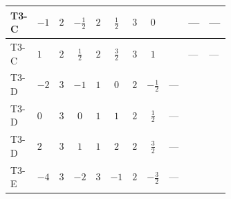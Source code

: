 \documentclass[8pt]{article}
\begin{document}
\begin{landscape}
\begin{longtable}{@{}llcccccc >{\raggedright\arraybackslash}p{0.21\linewidth} >{\raggedright\arraybackslash}p{0.21\linewidth} >{\raggedright\arraybackslash}p{0.21\linewidth}@{}}
\midrule
T3-C & $-1$ & $2$ & $-\frac{1}{2}$ & $2$ & $\frac{1}{2}$ & $3$ & $0$ & \scriptsize\adjustbox{max width=\linewidth}{$\begin{gathered} {m_1^2} (3 T_{\nu}^{(1)}+6 {\lambda_{S_1}^{(1)}})\end{gathered}$} & --- & --- \\
\midrule
T3-C & $1$ & $2$ & $\frac{1}{2}$ & $2$ & $\frac{3}{2}$ & $3$ & $1$ & \scriptsize\adjustbox{max width=\linewidth}{$\begin{gathered} {m_1^2} (3 T_{\nu}^{(1)}+6 {\lambda_{S_1}^{(1)}})\end{gathered}$} & --- & --- \\
\midrule
T3-D & $-2$ & $3$ & $-1$ & $1$ & $0$ & $2$ & $-\frac{1}{2}$ & --- & \scriptsize\adjustbox{max width=\linewidth}{$\begin{gathered} {m_1^2} (2 T_{\nu}^{(1)}+8 {\lambda_{S_1}^{(1)}}+4 {\lambda_{S_1}^{(A)}})\end{gathered}$} & \scriptsize\adjustbox{max width=\linewidth}{$\begin{gathered} -12 {g_2}^2 {m_1^2}\end{gathered}$} \\
\midrule
T3-D & $0$ & $3$ & $0$ & $1$ & $1$ & $2$ & $\frac{1}{2}$ & --- & \scriptsize\adjustbox{max width=\linewidth}{$\begin{gathered} {m_1^2} (2 T_{\nu}^{(1)}+8 {\lambda_{S_1}^{(1)}}+4 {\lambda_{S_1}^{(A)}})\end{gathered}$} & \scriptsize\adjustbox{max width=\linewidth}{$\begin{gathered} -12 {g_2}^2 {m_1^2}\end{gathered}$} \\
\midrule
T3-D & $2$ & $3$ & $1$ & $1$ & $2$ & $2$ & $\frac{3}{2}$ & --- & \scriptsize\adjustbox{max width=\linewidth}{$\begin{gathered} {m_1^2} (2 T_{\nu}^{(1)}+8 {\lambda_{S_1}^{(1)}}+4 {\lambda_{S_1}^{(A)}})\end{gathered}$} & \scriptsize\adjustbox{max width=\linewidth}{$\begin{gathered} -12 {g_2}^2 {m_1^2}\end{gathered}$} \\
\midrule
T3-E & $-4$ & $3$ & $-2$ & $3$ & $-1$ & $2$ & $-\frac{3}{2}$ & --- & \scriptsize\adjustbox{max width=\linewidth}{$\begin{gathered} {m_1^2} (2 T_{\nu}^{(1)}+8 {\lambda_{S_1}^{(1)}}+4 {\lambda_{S_1}^{(A)}})\end{gathered}$} & \scriptsize\adjustbox{max width=\linewidth}{$\begin{gathered} -12 {g_2}^2 {m_1^2}\end{gathered}$} \\

\end{longtable}
\end{landscape}
\end{document}
